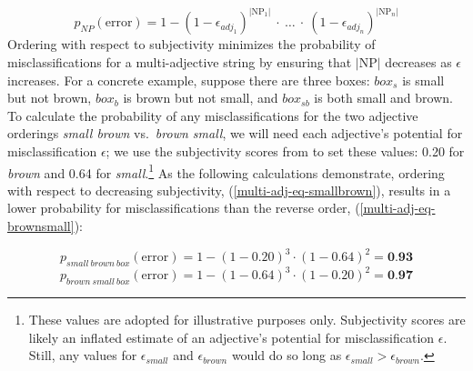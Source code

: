 \documentclass{sp}
\newcommand{\gcs}[1]{\textcolor{blue}{[gcs: #1]}}
\begin{document}
\begin{equation} \label{multi-adj-eq}
p_{N\!P}(\textrm{error}) = 1 - (1-\epsilon_{adj_1})^{|\textrm{NP}_1|}\ \cdot\ \ldots\ \cdot\ (1-\epsilon_{adj_n})^{|\textrm{NP}_n|}
\end{equation}
Ordering with respect to subjectivity minimizes the probability of misclassifications for a multi-adjective string by ensuring that $|\textrm{NP}|$ decreases as $\epsilon$ increases. For a concrete example, suppose there are three boxes: $box_{s}$ is small but not brown, $box_{b}$ is brown but not small, and $box_{sb}$ is both small and brown. To calculate the probability of any misclassifications for the two adjective orderings \emph{small brown} vs.~\emph{brown small}, we will need each adjective's potential for misclassification $\epsilon$; we use the subjectivity scores from \cite{scontrasetal2017adjectives} to set these values: 0.20 for \emph{brown} and 0.64 for \emph{small}.\footnote{These values are adopted for illustrative purposes only. Subjectivity scores are likely an inflated estimate of an adjective's potential for misclassification $\epsilon$. Still, any values for $\epsilon_{small}$ and $\epsilon_{brown}$ would do so long as $\epsilon_{small} > \epsilon_{brown}$.} As the following calculations demonstrate, ordering with respect to decreasing subjectivity, (\ref{multi-adj-eq-smallbrown}), results in a lower probability for misclassifications than the reverse order, (\ref{multi-adj-eq-brownsmall}):

\begin{equation} \label{multi-adj-eq-smallbrown}
p_{small\ brown\ box}(\textrm{error}) = 1 - (1-0.20)^{3} \cdot (1-0.64)^{2} = \textbf{0.93}
\end{equation}
\begin{equation} \label{multi-adj-eq-brownsmall}
p_{brown\ small\ box}(\textrm{error}) = 1 - (1-0.64)^{3} \cdot (1-0.20)^{2} = \textbf{0.97}
\end{equation}
\end{document}

